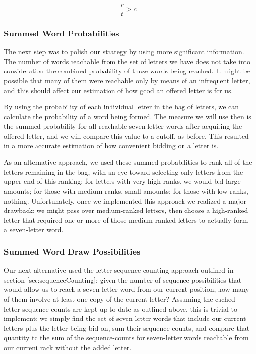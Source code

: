 \documentclass[11pt]{article}
\begin{document}
$$\frac{r}{t}>c$$

\subsubsection{Summed Word Probabilities}

The next step was to polish our strategy by using more significant information. The number of words reachable from the set of letters we have does not take into consideration the combined probability of those words being reached. It might be possible that many of them were reachable only by means of an infrequent letter, and this should affect our estimation of how good an offered letter is for us.

By using the probability of each individual letter in the bag of letters, we can calculate the probability of a word being formed. 
The measure we will use then is the summed probability for all reachable seven-letter words after acquiring the offered letter, and we will compare this value to a cutoff, as before. This resulted in a more accurate estimation of how convenient bidding on a letter is.

As an alternative approach, we used these summed probabilities to rank all of the letters remaining in the bag, with an eye toward selecting only letters from the upper end of this ranking: for letters with very high ranks, we would bid large amounts; for those with medium ranks, small amounts; for those with low ranks, nothing.  Unfortunately, once we implemented this approach we realized a major drawback: we might pass over medium-ranked letters, then choose a high-ranked letter that required one or more of those medium-ranked letters to actually form a seven-letter word.

\subsubsection{Summed Word Draw Possibilities}

Our next alternative used the letter-sequence-counting approach outlined in section \ref{sec:sequenceCounting}: given the number of sequence possibilities that would allow us to reach a seven-letter word from our current position, how many of them involve at least one copy of the current letter?  Assuming the cached letter-sequence-counts are kept up to date as outlined above, this is trivial to implement: we simply find the set of seven-letter words that include our current letters plus the letter being bid on, sum their sequence counts, and compare that quantity to the sum of the sequence-counts for seven-letter words reachable from our current rack without the added letter.
\end{document}

